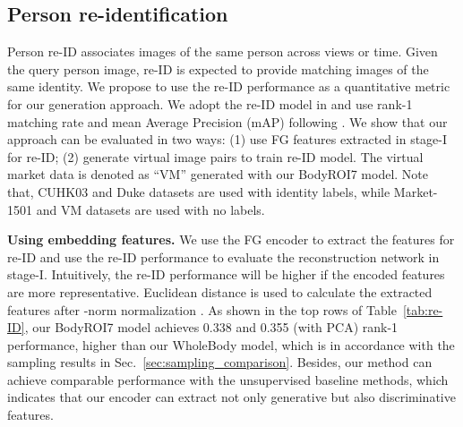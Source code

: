\documentclass[10pt,twocolumn,letterpaper]{article}
\newcommand{\myparagraph}[1]{\vspace{0.0em}\noindent\textbf{#1}}
\begin{document}
\subsection{Person re-identification}
\vspace{-1mm}
Person re-ID associates images of the same person across views or time.
Given the query person image, re-ID is expected to provide matching images of the same identity.
We propose to use the re-ID performance as a quantitative metric for our generation approach. 
We adopt the re-ID model in \cite{PUL} and use rank-1 matching rate and mean Average Precision (mAP) following \cite{Market1501}. 
We show that our approach can be evaluated in two ways: (1) use FG features extracted in stage-\RN{1} for re-ID; (2) generate virtual image pairs to train re-ID model. The virtual market data is denoted as ``VM'' generated with our BodyROI7 model. 
Note that, CUHK03 \cite{CUHK03} and Duke \cite{GAN_reid} datasets are used with identity labels, while Market-1501 and VM datasets are used with no labels.

\myparagraph{Using embedding features.}
We use the FG encoder to extract the features for re-ID and use the re-ID performance to evaluate the reconstruction network in stage-\RN{1}.
Intuitively, the re-ID performance will be higher if the encoded features are more representative.
Euclidean distance is used to calculate the extracted features after -norm normalization \cite{PUL}.
As shown in the top rows of Table~\ref{tab:re-ID}, our BodyROI7 model achieves 0.338 and 0.355 (with PCA) rank-1 performance, higher than our WholeBody model, which is in accordance with the sampling results in Sec.~\ref{sec:sampling_comparison}. 
Besides, our method can achieve comparable performance with the unsupervised baseline methods, which indicates that our encoder can extract not only generative but also discriminative features.
\end{document}
